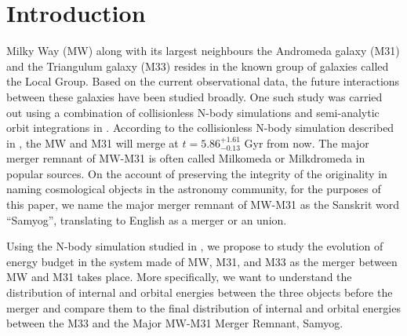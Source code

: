 \documentclass[twocolumn]{aastex631}
\begin{document}

\author[0000-0001-7379-2625]{Jay Motka} 




\section{Introduction}
\label{sec:intro}

Milky Way (MW) along with its largest neighbours the Andromeda galaxy (M31) and the Triangulum galaxy (M33) resides in the known group of galaxies called the Local Group. Based on the current observational data, the future interactions between these galaxies have been studied broadly. One such study was carried out using a combination of collisionless N-body simulations and semi-analytic orbit integrations in \cite{simulation}. According to the collisionless N-body simulation described in \cite{simulation}, the MW and M31 will merge at $t = 5.86^{+1.61}_{-0.13}$ Gyr from now. The major merger remnant of MW-M31 is often called Milkomeda or Milkdromeda in popular sources. On the account of preserving the integrity of the originality in naming cosmological objects in the astronomy community, for the purposes of this paper, we name the major merger remnant of MW-M31 as the Sanskrit word ``Samyog'', translating to English as a merger or an union.   

Using the N-body simulation studied in \cite{simulation}, we propose to study the evolution of energy budget in the system made of MW, M31, and M33 as the merger between MW and M31 takes place. More specifically, we want to understand the distribution of internal and orbital energies between the three objects before the merger and compare them to the final distribution of internal and orbital energies between the M33 and the Major MW-M31 Merger Remnant, Samyog. 
\end{document}

